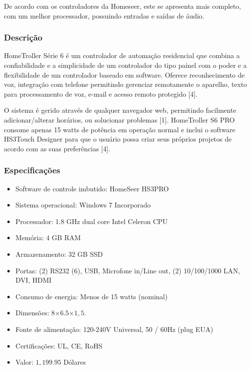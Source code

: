 	De acordo com os controladores da Homeseer, este se apresenta mais completo, com um melhor processador, possuindo entradas e saídas de áudio. 

\subsubsection{Descrição}

	HomeTroller Série 6 é um controlador de automação residencial que combina a confiabilidade e a simplicidade de um controlador do tipo painel com o poder e a flexibilidade de um controlador baseado em software. Oferece reconhecimento de voz, integração com telefone permitindo gerenciar remotamente o aparelho, texto para processamento de voz, e-mail e acesso remoto protegido [4].

	O sistema é gerido através de qualquer navegador web, permitindo facilmente adicionar/alterar horários, ou solucionar problemas [1]. HomeTroller S6 PRO consome apenas 15 watts de potência em operação normal e inclui o software HS3Touch Designer para que o usuário possa criar seus próprios projetos de acordo com as suas preferências [4].

\subsubsection{Especificações}
\begin{itemize}
\item Software de controle imbutido: HomeSeer HS3PRO
\item Sistema operacional: Windows 7 Incorporado
\item Processador: 1.8 GHz dual core Intel Celeron CPU
\item Memória: 4 GB RAM
\item Armazenamento: 32 GB SSD
\item Portas: (2) RS232 (6), USB, Microfone in/Line out, (2) 10/100/1000 LAN, DVI, HDMI
\item Consumo de energia: Menos de 15 watts (nominal)
\item Dimensões: $8$\textquotedbl$\times6.5$\textquotedbl$\times1,5$\textquotedbl.
\item Fonte de alimentação: 120-240V Universal, 50 / 60Hz (plug EUA)
\item Certificações: UL, CE, RoHS
\item Valor: $1,199.95$ Dólares 
\end{itemize}

